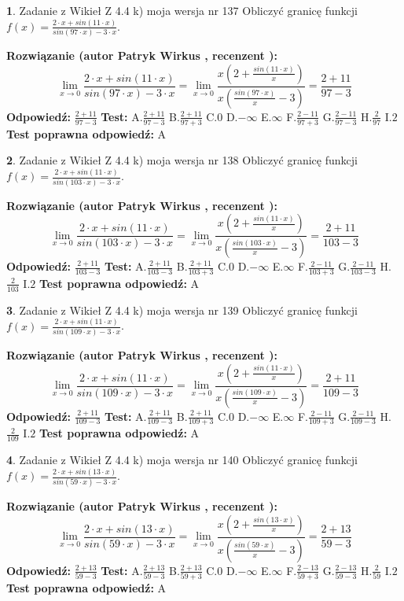 \documentclass[12pt, a4paper]{article}
\theoremstyle{definition} %
\newtheorem{zad}{}
\newcommand{\zadStart}[1]{\begin{zad}#1\newline}
\newcommand{\zadStop}{\end{zad}}
\newcommand{\rozwStart}[2]{\noindent \textbf{Rozwiązanie (autor #1 , recenzent #2): }\newline}
\newcommand{\rozwStop}{\newline}
\newcommand{\odpStart}{\noindent \textbf{Odpowiedź:}\newline}
\newcommand{\odpStop}{\newline}
\newcommand{\testStart}{\noindent \textbf{Test:}\newline}
\newcommand{\testStop}{\newline}
\newcommand{\kluczStart}{\noindent \textbf{Test poprawna odpowiedź:}\newline}
\newcommand{\kluczStop}{\newline}
\begin{document}
\zadStart{Zadanie z Wikieł Z 4.4 k) moja wersja nr 137}
Obliczyć granicę funkcji $f(x)=\frac{2\cdot x +sin(11\cdot x)}{sin(97\cdot x) -3\cdot x}$.
\zadStop
\rozwStart{Patryk Wirkus}{}
$$\lim\limits_{x\to 0}\frac{2\cdot x +sin(11\cdot x)}{sin(97\cdot x) -3\cdot x}
=\lim\limits_{x\to 0}\frac{x(2+\frac{sin(11\cdot x)}{x})}{x(\frac{sin(97\cdot x)}{x}-3)}
=\frac{2+11}{97-3}$$
\rozwStop
\odpStart
$\frac{2+11}{97-3}$
\odpStop
\testStart
A.$\frac{2+11}{97-3}$
B.$\frac{2+11}{97+3}$
C.$0$
D.$-\infty$
E.$\infty$
F.$\frac{2-11}{97+3}$
G.$\frac{2-11}{97-3}$
H.$\frac{2}{97}$
I.$2$
\testStop
\kluczStart
A
\kluczStop



\zadStart{Zadanie z Wikieł Z 4.4 k) moja wersja nr 138}
Obliczyć granicę funkcji $f(x)=\frac{2\cdot x +sin(11\cdot x)}{sin(103\cdot x) -3\cdot x}$.
\zadStop
\rozwStart{Patryk Wirkus}{}
$$\lim\limits_{x\to 0}\frac{2\cdot x +sin(11\cdot x)}{sin(103\cdot x) -3\cdot x}
=\lim\limits_{x\to 0}\frac{x(2+\frac{sin(11\cdot x)}{x})}{x(\frac{sin(103\cdot x)}{x}-3)}
=\frac{2+11}{103-3}$$
\rozwStop
\odpStart
$\frac{2+11}{103-3}$
\odpStop
\testStart
A.$\frac{2+11}{103-3}$
B.$\frac{2+11}{103+3}$
C.$0$
D.$-\infty$
E.$\infty$
F.$\frac{2-11}{103+3}$
G.$\frac{2-11}{103-3}$
H.$\frac{2}{103}$
I.$2$
\testStop
\kluczStart
A
\kluczStop



\zadStart{Zadanie z Wikieł Z 4.4 k) moja wersja nr 139}
Obliczyć granicę funkcji $f(x)=\frac{2\cdot x +sin(11\cdot x)}{sin(109\cdot x) -3\cdot x}$.
\zadStop
\rozwStart{Patryk Wirkus}{}
$$\lim\limits_{x\to 0}\frac{2\cdot x +sin(11\cdot x)}{sin(109\cdot x) -3\cdot x}
=\lim\limits_{x\to 0}\frac{x(2+\frac{sin(11\cdot x)}{x})}{x(\frac{sin(109\cdot x)}{x}-3)}
=\frac{2+11}{109-3}$$
\rozwStop
\odpStart
$\frac{2+11}{109-3}$
\odpStop
\testStart
A.$\frac{2+11}{109-3}$
B.$\frac{2+11}{109+3}$
C.$0$
D.$-\infty$
E.$\infty$
F.$\frac{2-11}{109+3}$
G.$\frac{2-11}{109-3}$
H.$\frac{2}{109}$
I.$2$
\testStop
\kluczStart
A
\kluczStop



\zadStart{Zadanie z Wikieł Z 4.4 k) moja wersja nr 140}
Obliczyć granicę funkcji $f(x)=\frac{2\cdot x +sin(13\cdot x)}{sin(59\cdot x) -3\cdot x}$.
\zadStop
\rozwStart{Patryk Wirkus}{}
$$\lim\limits_{x\to 0}\frac{2\cdot x +sin(13\cdot x)}{sin(59\cdot x) -3\cdot x}
=\lim\limits_{x\to 0}\frac{x(2+\frac{sin(13\cdot x)}{x})}{x(\frac{sin(59\cdot x)}{x}-3)}
=\frac{2+13}{59-3}$$
\rozwStop
\odpStart
$\frac{2+13}{59-3}$
\odpStop
\testStart
A.$\frac{2+13}{59-3}$
B.$\frac{2+13}{59+3}$
C.$0$
D.$-\infty$
E.$\infty$
F.$\frac{2-13}{59+3}$
G.$\frac{2-13}{59-3}$
H.$\frac{2}{59}$
I.$2$
\testStop
\kluczStart
A
\kluczStop
\end{document}
